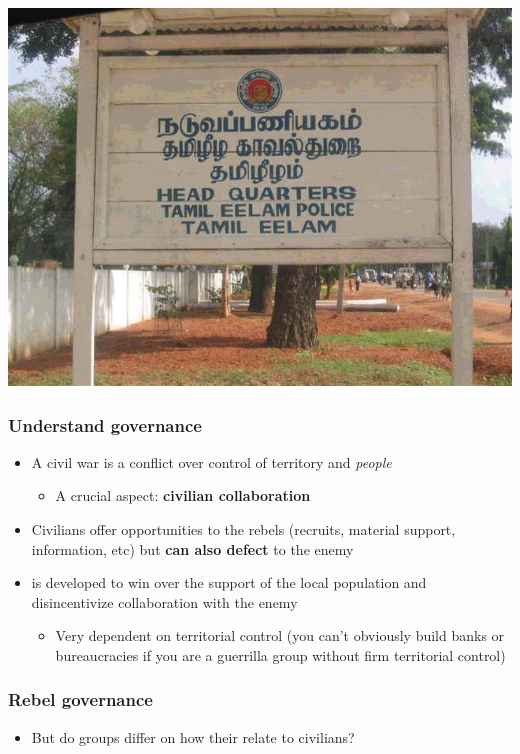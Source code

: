 \documentclass[aspectratio=43]{beamer}
\begin{document}
\begin{frame}
\begin{minipage}{0.59\textwidth}
  \includegraphics[width = .8\textwidth]{img/tamileelam_police}
\end{minipage}

\end{frame}

\begin{frame}
\frametitle{Understand governance}
\centering

\begin{itemize}
  \item<1-> A civil war is a conflict over control of territory and \textit{people}
  \begin{itemize}
    \item A crucial aspect: \textbf{civilian collaboration}
  \end{itemize}
  \item<2-> Civilians offer opportunities to the rebels (recruits, material support, information, etc) but \textbf{can also defect} to the enemy
  \item<3->  is developed to win over the support of the local population and disincentivize collaboration with the enemy
  \begin{itemize}
    \item<4-> Very dependent on territorial control (you can't obviously build banks or bureaucracies if you are a guerrilla group without firm territorial control)
  \end{itemize}
\end{itemize}

\end{frame}

\begin{frame}
\frametitle{Rebel governance}
\centering

\begin{itemize}
  \item But  do groups differ on how their relate to civilians?
\end{itemize}

\end{frame}
\end{document}
